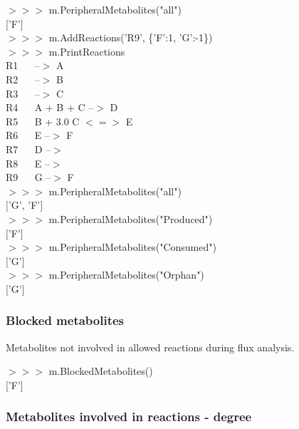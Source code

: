 \begin{framed}
$>>>$ m.PeripheralMetabolites("all")\\
$[$'F'$]$\\

$>>>$ m.AddReactions('R9', \{'F':1, 'G':-1\})\\
$>>>$ m.PrintReactions\\
R1 $\quad$ --$>$ A\\
R2 $\quad$ --$>$ B\\
R3 $\quad$ --$>$ C\\
R4 $\quad$ A + B + C --$>$ D\\
R5 $\quad$ B + 3.0 C $<=>$ E\\
R6 $\quad$ E --$>$ F\\
R7 $\quad$ D --$>$\\
R8 $\quad$ E --$>$\\
R9 $\quad$ G --$>$ F\\

$>>>$ m.PeripheralMetabolites("all")\\
$[$'G', 'F'$]$\\

$>>>$ m.PeripheralMetabolites("Produced")\\
$[$'F'$]$\\

$>>>$ m.PeripheralMetabolites("Consumed")\\
$[$'G'$]$\\

$>>>$ m.PeripheralMetabolites("Orphan")\\
$[$'G'$]$
\end{framed}



\subsubsection{Blocked metabolites}
Metabolites not involved in allowed reactions during flux analysis.

\begin{framed}
$>>>$ m.BlockedMetabolites()\\
$[$'F'$]$
\end{framed}


\subsubsection{Metabolites involved in reactions - degree}

